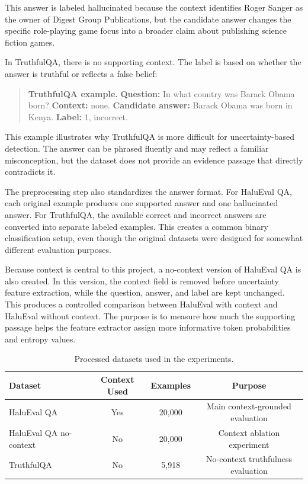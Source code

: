 \documentclass[11pt]{article}
\begin{document}
This answer is labeled hallucinated because the context identifies Roger Sanger as the owner of Digest Group Publications, but the candidate answer changes the specific role-playing game focus into a broader claim about publishing science fiction games.

In TruthfulQA, there is no supporting context. The label is based on whether the answer is truthful or reflects a false belief:

\begin{quote}
\small
\textbf{TruthfulQA example.} \textbf{Question:} In what country was Barack Obama born? \textbf{Context:} none. \textbf{Candidate answer:} Barack Obama was born in Kenya. \textbf{Label:} 1, incorrect.
\end{quote}

This example illustrates why TruthfulQA is more difficult for uncertainty-based detection. The answer can be phrased fluently and may reflect a familiar misconception, but the dataset does not provide an evidence passage that directly contradicts it.

The preprocessing step also standardizes the answer format. For HaluEval QA, each original example produces one supported answer and one hallucinated answer. For TruthfulQA, the available correct and incorrect answers are converted into separate labeled examples. This creates a common binary classification setup, even though the original datasets were designed for somewhat different evaluation purposes.

Because context is central to this project, a no-context version of HaluEval QA is also created. In this version, the context field is removed before uncertainty feature extraction, while the question, answer, and label are kept unchanged. This produces a controlled comparison between HaluEval with context and HaluEval without context. The purpose is to measure how much the supporting passage helps the feature extractor assign more informative token probabilities and entropy values.

\begin{table}[H]
    \centering
    \begin{tabular}{lccc}
        \toprule
        Dataset & Context Used & Examples & Purpose \\
        \midrule
        HaluEval QA & Yes & 20,000 & Main context-grounded evaluation \\
        HaluEval QA no-context & No & 20,000 & Context ablation experiment \\
        TruthfulQA & No & 5,918 & No-context truthfulness evaluation \\
        \bottomrule
    \end{tabular}
    \caption{Processed datasets used in the experiments.}
    \label{tab:processed-datasets}
\end{table}
\end{document}
